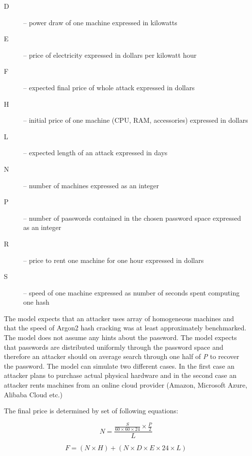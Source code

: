 \documentclass[nolof,digital]{fithesis3}
\begin{document}
\begin{description}
\item[D] -- power draw of one machine expressed in kilowatts

\item[E] -- price of electricity expressed in dollars per kilowatt hour

\item[F] -- expected final price of whole attack expressed in dollars

\item[H] -- initial price of one machine (CPU, RAM, accessories) expressed in dollars

\item[L] -- expected length of an attack expressed in days

\item[N] -- number of machines expressed as an integer

\item[P] -- number of passwords contained in the chosen password space expressed as an integer

\item[R] -- price to rent one machine for one hour expressed in dollars

\item[S] -- speed of one machine expressed as number of seconds spent computing one hash
\end{description}

The model expects that an attacker uses array of homogeneous machines and that the speed of Argon2 hash cracking was at least approximately benchmarked. The model does not assume any hints about the password. The model expects that passwords are distributed uniformly through the password space and therefore an attacker should on average search through one half of \emph{P} to recover the password. The model can simulate two different cases. In the first case an attacker plans to purchase actual physical hardware and in the second case an attacker rents machines from an online cloud provider (Amazon, Microsoft Azure, Alibaba Cloud etc.)

The final price is determined by set of following equations:

\begin{equation}
\label{eq1}
N = \frac{\frac{S}{60 \times 60 \times 24} \times \frac{P}{2}}{L}
\end{equation}

\begin{equation}
\label{eq2}
F = ( N \times H ) + ( N \times D \times E \times 24 \times L)
\end{equation}
\end{document}
